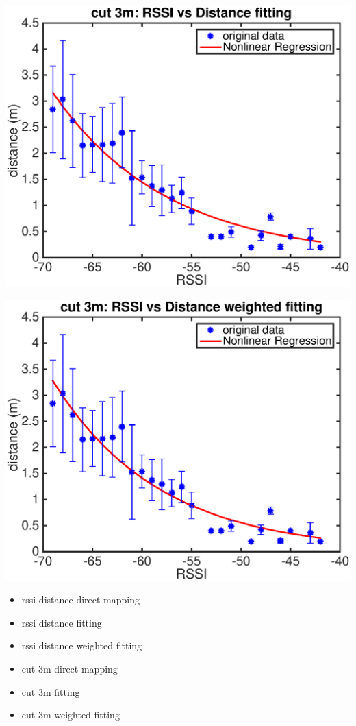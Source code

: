 \documentclass[11pt]{beamer}
\begin{document}
\begin{frame}
\includegraphics[width=\textwidth]{cut_3m_rssi_dis_fit_4dot4m.eps} 
\end{frame}

\begin{frame}
\includegraphics[width=\textwidth]{cut_3m_rssi_dis_fit_weighted_4dot4m.eps} 
\end{frame}


\begin{frame}
\begin{itemize}
\item rssi distance direct mapping
\item rssi distance fitting
\item rssi distance weighted fitting
\item cut 3m direct mapping
\item cut 3m fitting
\item cut 3m weighted fitting
\end{itemize}
\end{frame}
\end{document}
